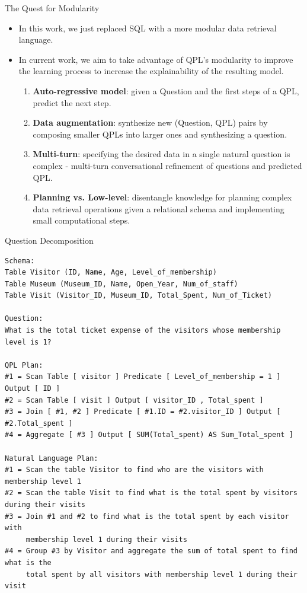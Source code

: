 \documentclass{beamer}
\begin{document}
\begin{frame}{The Quest for Modularity}
    \begin{itemize}
        \item In this work, we just replaced SQL with a more modular data retrieval language.
        \item In current work, we aim to take advantage of QPL's modularity to improve the learning process to increase the explainability of the resulting model.
        \begin{enumerate}
        \item \textbf{Auto-regressive model}: given a Question and the first steps of a QPL, predict the next step.
        \item \textbf{Data augmentation}: synthesize new (Question, QPL) pairs by composing smaller QPLs into larger ones and synthesizing a question.
        \item \textbf{Multi-turn}: specifying the desired data in a single natural question is complex - multi-turn conversational refinement of questions and predicted QPL.
        \item \textbf{Planning vs. Low-level}: disentangle knowledge for planning complex data retrieval operations given a relational schema and implementing small computational steps.
        \end{enumerate}
    \end{itemize}
\end{frame}

\begin{frame}[fragile]{Question Decomposition}
    \begin{verbatim}
Schema:
Table Visitor (ID, Name, Age, Level_of_membership)
Table Museum (Museum_ID, Name, Open_Year, Num_of_staff)
Table Visit (Visitor_ID, Museum_ID, Total_Spent, Num_of_Ticket)

Question:
What is the total ticket expense of the visitors whose membership level is 1?

QPL Plan:
#1 = Scan Table [ visitor ] Predicate [ Level_of_membership = 1 ] Output [ ID ]
#2 = Scan Table [ visit ] Output [ visitor_ID , Total_spent ]
#3 = Join [ #1, #2 ] Predicate [ #1.ID = #2.visitor_ID ] Output [ #2.Total_spent ]
#4 = Aggregate [ #3 ] Output [ SUM(Total_spent) AS Sum_Total_spent ]

Natural Language Plan:
#1 = Scan the table Visitor to find who are the visitors with membership level 1
#2 = Scan the table Visit to find what is the total spent by visitors during their visits
#3 = Join #1 and #2 to find what is the total spent by each visitor with
     membership level 1 during their visits
#4 = Group #3 by Visitor and aggregate the sum of total spent to find what is the
     total spent by all visitors with membership level 1 during their visit
    \end{verbatim}
\end{frame}
\end{document}
